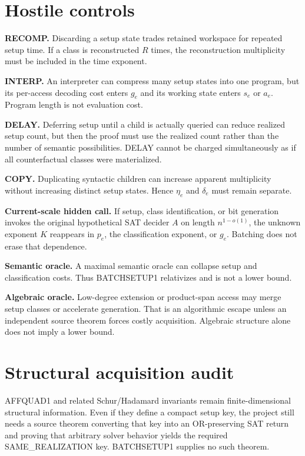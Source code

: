 \documentclass[11pt]{article}
\begin{document}
\section*{Hostile controls}
\textbf{RECOMP.} Discarding a setup state trades retained workspace for repeated setup time. If a class is reconstructed $R$ times, the reconstruction multiplicity must be included in the time exponent.

\textbf{INTERP.} An interpreter can compress many setup states into one program, but its per-access decoding cost enters $g_e$ and its working state enters $s_e$ or $a_e$. Program length is not evaluation cost.

\textbf{DELAY.} Deferring setup until a child is actually queried can reduce realized setup count, but then the proof must use the realized count rather than the number of semantic possibilities. DELAY cannot be charged simultaneously as if all counterfactual classes were materialized.

\textbf{COPY.} Duplicating syntactic children can increase apparent multiplicity without increasing distinct setup states. Hence $\eta_e$ and $\delta_e$ must remain separate.

\textbf{Current-scale hidden call.} If setup, class identification, or bit generation invokes the original hypothetical SAT decider $A$ on length $n^{1-o(1)}$, the unknown exponent $K$ reappears in $p_e$, the classification exponent, or $g_e$. Batching does not erase that dependence.

\textbf{Semantic oracle.} A maximal semantic oracle can collapse setup and classification costs. Thus BATCHSETUP1 relativizes and is not a lower bound.

\textbf{Algebraic oracle.} Low-degree extension or product-span access may merge setup classes or accelerate generation. That is an algorithmic escape unless an independent source theorem forces costly acquisition. Algebraic structure alone does not imply a lower bound.

\section*{Structural acquisition audit}
AFFQUAD1 and related Schur/Hadamard invariants remain finite-dimensional structural information. Even if they define a compact setup key, the project still needs a source theorem converting that key into an OR-preserving SAT return and proving that arbitrary solver behavior yields the required SAME\_REALIZATION key. BATCHSETUP1 supplies no such theorem.
\end{document}
